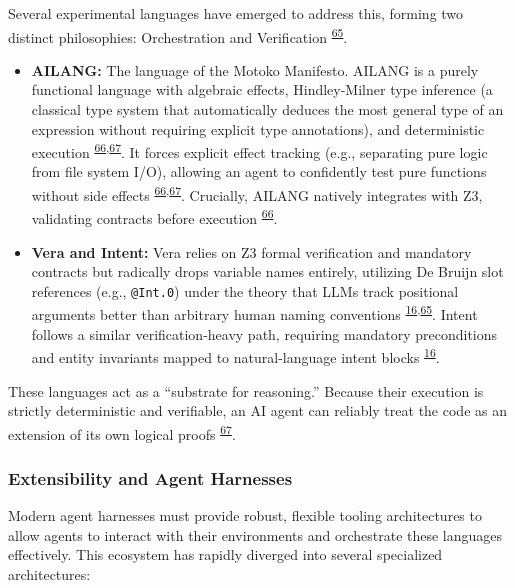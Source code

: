 \documentclass[
  11pt,
]{article}
\providecommand{\tightlist}{%
  \setlength{\itemsep}{0pt}\setlength{\parskip}{0pt}}
\begin{document}
Several experimental languages have emerged to address this, forming two
distinct philosophies: Orchestration and Verification
\textsuperscript{\protect\hyperlink{cite-65}{65}}.

\begin{itemize}
\tightlist
\item
  \textbf{AILANG:} The language of the Motoko Manifesto. AILANG is a
  purely functional language with algebraic effects, Hindley-Milner type
  inference (a classical type system that automatically deduces the most
  general type of an expression without requiring explicit type
  annotations), and deterministic execution
  \textsuperscript{\protect\hyperlink{cite-66}{66},\protect\hyperlink{cite-67}{67}}.
  It forces explicit effect tracking (e.g., separating pure logic from
  file system I/O), allowing an agent to confidently test pure functions
  without side effects
  \textsuperscript{\protect\hyperlink{cite-66}{66},\protect\hyperlink{cite-67}{67}}.
  Crucially, AILANG natively integrates with Z3, validating contracts
  before execution \textsuperscript{\protect\hyperlink{cite-66}{66}}.
\item
  \textbf{Vera and Intent:} Vera relies on Z3 formal verification and
  mandatory contracts but radically drops variable names entirely,
  utilizing De Bruijn slot references (e.g., \texttt{@Int.0}) under the
  theory that LLMs track positional arguments better than arbitrary
  human naming conventions
  \textsuperscript{\protect\hyperlink{cite-16}{16},\protect\hyperlink{cite-65}{65}}.
  Intent follows a similar verification-heavy path, requiring mandatory
  preconditions and entity invariants mapped to natural-language intent
  blocks \textsuperscript{\protect\hyperlink{cite-16}{16}}.
\end{itemize}

These languages act as a ``substrate for reasoning.'' Because their
execution is strictly deterministic and verifiable, an AI agent can
reliably treat the code as an extension of its own logical proofs
\textsuperscript{\protect\hyperlink{cite-67}{67}}.

\hypertarget{extensibility-and-agent-harnesses}{%
\subsubsection{Extensibility and Agent
Harnesses}\label{extensibility-and-agent-harnesses}}

Modern agent harnesses must provide robust, flexible tooling
architectures to allow agents to interact with their environments and
orchestrate these languages effectively. This ecosystem has rapidly
diverged into several specialized architectures:
\end{document}
